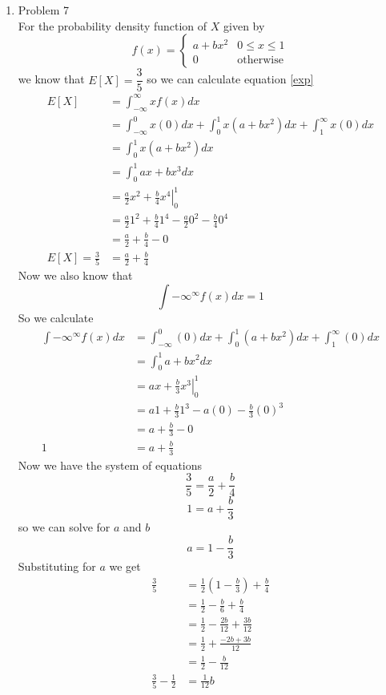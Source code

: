 \documentclass[11pt]{article}
\begin{document}
\begin{enumerate}
\item Problem 7\\
For the probability density function of $X$ given by
$$f(x) = \left\{\begin{array}{lc}
		a+bx^2  & 0\le x\le 1\\
		0	& \mbox{otherwise}
		\end{array}\right.$$
we know that $E[X] = \dfrac{3}{5}$ so we can calculate equation \ref{exp}
\begin{align*}
E[X] &= \int_{-\infty}^{\infty}xf(x)dx\\
 &= \int_{-\infty}^{0}x(0)dx + \int_{0}^{1}x(a+bx^2)dx + \int_{1}^{\infty}x(0)dx\\
 &= \int_{0}^{1}x(a+bx^2)dx\\
 &= \int_{0}^{1}ax+bx^3dx\\
 &= \left.\frac{a}{2}x^2+\frac{b}{4}x^4\right|_{0}^{1}\\
 &= \frac{a}{2}1^2+\frac{b}{4}1^4 - \frac{a}{2}0^2 - \frac{b}{4}0^4\\
 &= \frac{a}{2}+\frac{b}{4} - 0\\
E[X]=\frac{3}{5} &= \frac{a}{2}+\frac{b}{4}
\end{align*}
Now we also know that
$$\int{-\infty}^{\infty}f(x)dx =1$$
So we calculate
\begin{align*}
\int{-\infty}^{\infty}f(x)dx&= \int_{-\infty}^{0}(0)dx + \int_{0}^{1}(a+bx^2)dx + \int_{1}^{\infty}(0)dx\\
 &= \int_{0}^{1}a+bx^2dx\\
 &= \left.ax+\frac{b}{3}x^3\right|_{0}^{1}\\
 &= a1+\frac{b}{3}1^3 - a(0) - \frac{b}{3}(0)^3\\
 &= a+\frac{b}{3} - 0\\
1 &= a+\frac{b}{3}
\end{align*}
Now we have the system of equations 
$$\frac{3}{5} = \frac{a}{2}+\frac{b}{4}$$
$$1 = a+\frac{b}{3}$$
so we can solve for $a$ and $b$
$$a = 1 - \frac{b}{3}$$
Substituting for $a$ we get
\begin{align*}
\frac{3}{5} &= \frac{1}{2}\left(1 - \frac{b}{3}\right)+\frac{b}{4}\\
&= \frac{1}{2} - \frac{b}{6}+\frac{b}{4}\\
&= \frac{1}{2} - \frac{2b}{12}+\frac{3b}{12}\\
&= \frac{1}{2}  + \frac{-2b+3b}{12}\\
&= \frac{1}{2} - \frac{b}{12}\\
\frac{3}{5} - \frac{1}{2} &= \frac{1}{12}b\\

\end{align*}
\end{enumerate}
\end{document}
